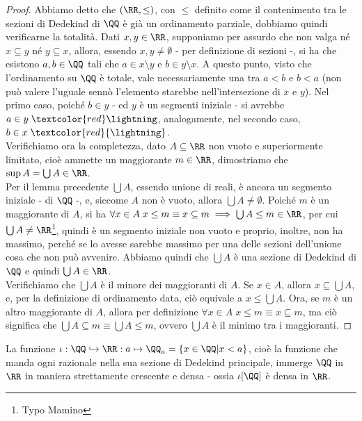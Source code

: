 \begin{proof}
	Abbiamo detto che $(\RR,\leq)$, con $\leq$ definito come il contenimento tra le sezioni di Dedekind di $\QQ$ è già un ordinamento parziale, dobbiamo quindi verificarne la totalità.
	Dati $x,y \in \RR$, supponiamo per assurdo che non valga né $x \subseteq y$ né $y \subseteq x$, allora, essendo $x,y \ne \emptyset$ - per definizione di sezioni -, si ha che esistono $a,b \in \QQ$ tali che $a \in x \setminus y$ e $b \in y \setminus x$.
	A questo punto, visto che l'ordinamento su $\QQ$ è totale, vale necessariamente una tra $a < b$ e $b < a$ (non può valere l'uguale sennò l'elemento starebbe nell'intersezione di $x$ e $y$).
	Nel primo caso, poiché $b \in y$ - ed $y$ è un segmenti iniziale - si avrebbe $a \in y \;\textcolor{red}\lightning$, analogamente, nel secondo caso, $b \in x \; \textcolor{red}{\lightning}$.\\
	Verifichiamo ora la completezza, dato $A \subseteq \RR$ non vuoto e superiormente limitato, cioè ammette un maggiorante $m \in \RR$, dimostriamo che $\sup A = \bigcup A \in \RR$.\\
	Per il lemma precedente $\bigcup A$, essendo unione di reali, è ancora un segmento iniziale - di $\QQ$ -, e, siccome $A$ non è vuoto, allora $\bigcup A \ne \emptyset$. Poiché $m$ è un maggiorante di $A$,
	si ha $\forall x \in A \; x \leq m \equiv x \subseteq m \implies \bigcup A \leq m \in \RR$, per cui $\bigcup A \ne \RR$\footnote{Typo Mamino}, quindi è un segmento iniziale non vuoto e proprio, inoltre, non ha massimo,
	perché se lo avesse sarebbe massimo per una delle sezioni dell'unione cosa che non può avvenire. Abbiamo quindi che $\bigcup A$ è una sezione di Dedekind di $\QQ$ e quindi $\bigcup A \in \RR$. \\
	Verifichiamo che $\bigcup A$ è il minore dei maggioranti di $A$. Se $x \in A$, allora $x \subseteq \bigcup A$, e, per la definizione di ordinamento data, ciò equivale a $x \leq \bigcup A$.
	Ora, se $m$ è un altro maggiorante di $A$, allora per definizione $\forall x \in A \; x \leq m \equiv x \subseteq m$, ma ciò significa che $\bigcup A \subseteq m \equiv \bigcup A \leq m$, ovvero $\bigcup A$ è il minimo tra i maggioranti.
\end{proof}

\begin{remark}
	La funzione $\iota : \QQ \hookrightarrow \RR : a \mapsto \QQ_a = \{x \in \QQ | x < a\}$, cioè la funzione che manda ogni razionale nella sua sezione di Dedekind principale,
	immerge $\QQ$ in $\RR$ in maniera strettamente crescente e densa - ossia $\iota[\QQ]$ è densa in $\RR$.
\end{remark}

